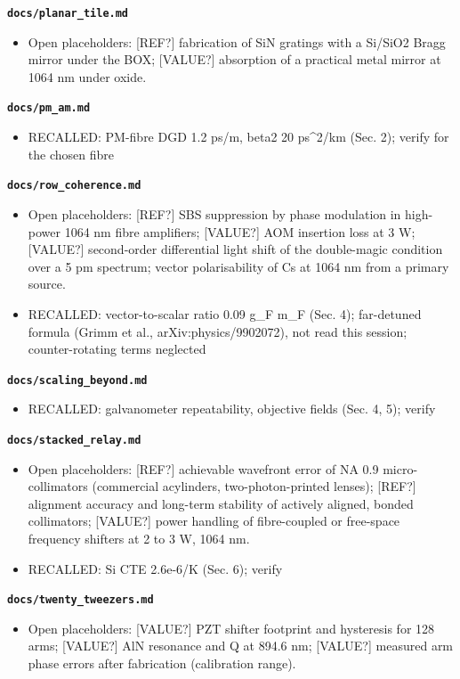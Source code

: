 \textbf{\texttt{docs/planar\_\allowbreak{}tile.md}}

\begin{itemize}
\tightlist
\item
  Open placeholders: {[}REF?{]} fabrication of SiN gratings with a
  Si/SiO2 Bragg mirror under the BOX; {[}VALUE?{]} absorption of a
  practical metal mirror at 1064 nm under oxide.
\end{itemize}

\textbf{\texttt{docs/pm\_\allowbreak{}am.md}}

\begin{itemize}
\tightlist
\item
  RECALLED: PM-fibre DGD 1.2 ps/m, beta2 20 ps\^{}2/km (Sec. 2); verify
  for the chosen fibre
\end{itemize}

\textbf{\texttt{docs/row\_\allowbreak{}coherence.md}}

\begin{itemize}
\tightlist
\item
  Open placeholders: {[}REF?{]} SBS suppression by phase modulation in
  high-power 1064 nm fibre amplifiers; {[}VALUE?{]} AOM insertion loss
  at 3 W; {[}VALUE?{]} second-order differential light shift of the
  double-magic condition over a 5 pm spectrum; vector polarisability of
  Cs at 1064 nm from a primary source.
\item
  RECALLED: vector-to-scalar ratio 0.09 g\_\allowbreak{}F m\_\allowbreak{}F (Sec. 4); far-detuned
  formula (Grimm et al., arXiv:physics/9902072), not read this session;
  counter-rotating terms neglected
\end{itemize}

\textbf{\texttt{docs/scaling\_\allowbreak{}beyond.md}}

\begin{itemize}
\tightlist
\item
  RECALLED: galvanometer repeatability, objective fields (Sec. 4, 5);
  verify
\end{itemize}

\textbf{\texttt{docs/stacked\_\allowbreak{}relay.md}}

\begin{itemize}
\tightlist
\item
  Open placeholders: {[}REF?{]} achievable wavefront error of NA 0.9
  micro-collimators (commercial acylinders, two-photon-printed lenses);
  {[}REF?{]} alignment accuracy and long-term stability of actively
  aligned, bonded collimators; {[}VALUE?{]} power handling of
  fibre-coupled or free-space frequency shifters at 2 to 3 W, 1064 nm.
\item
  RECALLED: Si CTE 2.6e-6/K (Sec. 6); verify
\end{itemize}

\textbf{\texttt{docs/twenty\_\allowbreak{}tweezers.md}}

\begin{itemize}
\tightlist
\item
  Open placeholders: {[}VALUE?{]} PZT shifter footprint and hysteresis
  for 128 arms; {[}VALUE?{]} AlN resonance and Q at 894.6 nm;
  {[}VALUE?{]} measured arm phase errors after fabrication (calibration
  range).
\end{itemize}
